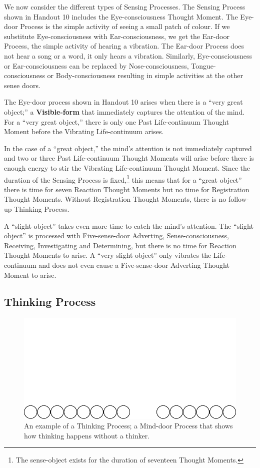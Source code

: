We now consider the different types of Sensing Processes. The Sensing Process shown in Handout 10 includes the Eye-consciousness Thought Moment. The Eye-door Process is the simple activity of seeing a small patch of colour. If we substitute Eye-consciousness with Ear-consciousness, we get the Ear-door Process, the simple activity of hearing a vibration. The Ear-door Process does not hear a song or a word, it only hears a vibration. Similarly, Eye-consciousness or Ear-consciousness can be replaced by Nose-consciousness, Tongue-consciousness or Body-consciousness resulting in simple activities at the other sense doors.

The Eye-door process shown in Handout 10 arises when there is a “very great object;” a \textbf{Visible-form} that immediately captures the attention of the mind. For a “very great object,” there is only one Past Life-continuum Thought Moment before the Vibrating Life-continuum arises. 

In the case of a “great object,” the mind’s attention is not immediately captured and two or three Past Life-continuum Thought Moments will arise before there is enough energy to stir the Vibrating Life-continuum Thought Moment. Since the duration of the Sensing Process is fixed,\footnote{The sense-object exists for the duration of seventeen Thought Moments.} this means that for a “great object” there is time for seven Reaction Thought Moments but no time for Registration Thought Moments. Without Registration Thought Moments, there is no follow-up Thinking Process.

A “slight object” takes even more time to catch the mind’s attention. The “slight object” is processed with Five-sense-door Adverting, Sense-consciousness, Receiving, Investigating and Determining, but there is no time for Reaction Thought Moments to arise. A “very slight object” only vibrates the Life-continuum and does not even cause a Five-sense-door Adverting Thought Moment to arise.

\subsection*{Thinking Process}

\begin{figure}[h]
\centering
\includegraphics[width=0.8\linewidth]{./Diagrams/Process2}
\caption{An example of a Thinking Process; a Mind-door Process that shows how thinking happens without a thinker.}
\label{fig:Process2}
\end{figure}

